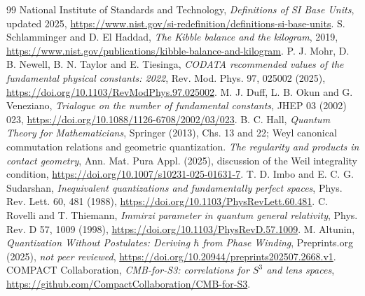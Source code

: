 \documentclass[11pt,a4paper]{article}
\newcommand{\h}{\hbar}
\begin{document}
\begin{thebibliography}{99}
 National Institute of Standards and Technology, \emph{Definitions of SI Base Units}, updated 2025, \url{https://www.nist.gov/si-redefinition/definitions-si-base-units}.
 S. Schlamminger and D. El Haddad, \emph{The Kibble balance and the kilogram}, 2019, \url{https://www.nist.gov/publications/kibble-balance-and-kilogram}.
 P. J. Mohr, D. B. Newell, B. N. Taylor and E. Tiesinga, \emph{CODATA recommended values of the fundamental physical constants: 2022}, Rev. Mod. Phys. 97, 025002 (2025), \url{https://doi.org/10.1103/RevModPhys.97.025002}.
 M. J. Duff, L. B. Okun and G. Veneziano, \emph{Trialogue on the number of fundamental constants}, JHEP 03 (2002) 023, \url{https://doi.org/10.1088/1126-6708/2002/03/023}.
 B. C. Hall, \emph{Quantum Theory for Mathematicians}, Springer (2013), Chs. 13 and 22; Weyl canonical commutation relations and geometric quantization.
 \emph{The regularity and products in contact geometry}, Ann. Mat. Pura Appl. (2025), discussion of the Weil integrality condition, \url{https://doi.org/10.1007/s10231-025-01631-7}.
 T. D. Imbo and E. C. G. Sudarshan, \emph{Inequivalent quantizations and fundamentally perfect spaces}, Phys. Rev. Lett. 60, 481 (1988), \url{https://doi.org/10.1103/PhysRevLett.60.481}.
 C. Rovelli and T. Thiemann, \emph{Immirzi parameter in quantum general relativity}, Phys. Rev. D 57, 1009 (1998), \url{https://doi.org/10.1103/PhysRevD.57.1009}.
 M. Altunin, \emph{Quantization Without Postulates: Deriving $\h$ from Phase Winding}, Preprints.org (2025), \emph{not peer reviewed}, \url{https://doi.org/10.20944/preprints202507.2668.v1}.
 COMPACT Collaboration, \emph{CMB-for-S3: correlations for $S^3$ and lens spaces}, \url{https://github.com/CompactCollaboration/CMB-for-S3}.
\end{thebibliography}
\end{document}
